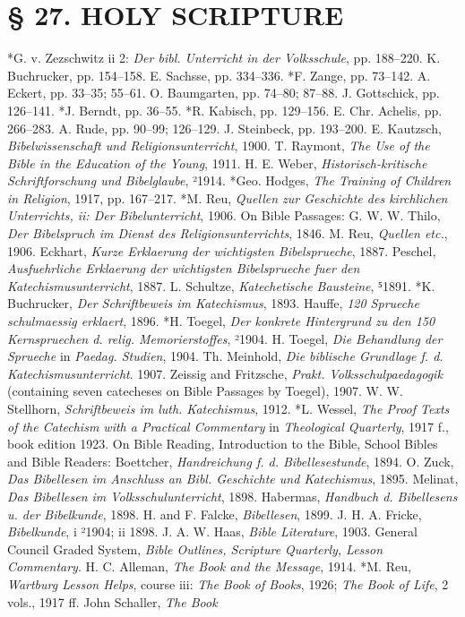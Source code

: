 \chapter[§ 27. Holy Scripture]{§ 27. HOLY SCRIPTURE}

*G. v. Zezschwitz ii 2: \emph{Der bibl. Unterricht in der Volksschule}, pp. 188–220. K. Buchrucker, pp. 154–158. E. Sachsse, pp. 334–336. *F. Zange, pp. 73–142. A. Eckert, pp. 33–35; 55–61. O. Baumgarten, pp. 74–80; 87–88. J. Gottschick, pp. 126–141. *J. Berndt, pp. 36–55. *R. Kabisch, pp. 129–156. E. Chr. Achelis, pp. 266–283. A. Rude, pp. 90–99; 126–129. J. Steinbeck, pp. 193–200. E. Kautzsch, \emph{Bibelwissenschaft und Religionsunterricht}, 1900. T. Raymont, \emph{The Use of the Bible in the Education of the Young}, 1911. H. E. Weber, \emph{Historisch-kritische Schriftforschung und Bibelglaube}, ²1914. *Geo. Hodges, \emph{The Training of Children in Religion}, 1917, pp. 167–217. *M. Reu, \emph{Quellen zur Geschichte des kirchlichen Unterrichts, ii: Der Bibelunterricht}, 1906. On Bible Passages: G. W. W. Thilo, \emph{Der Bibelspruch im Dienst des Religionsunterrichts}, 1846. M. Reu, \emph{Quellen etc.}, 1906. Eckhart, \emph{Kurze Erklaerung der wichtigsten Bibelsprueche}, 1887. Peschel, \emph{Ausfuehrliche Erklaerung der wichtigsten Bibelsprueche fuer den Katechismusunterricht}, 1887. L. Schultze, \emph{Katechetische Bausteine}, ⁵1891. *K. Buchrucker, \emph{Der Schriftbeweis im Katechismus}, 1893. Hauffe, \emph{120 Sprueche schulmaessig erklaert}, 1896. *H. Toegel, \emph{Der konkrete Hintergrund zu den 150 Kernspruechen d. relig. Memorierstoffes}, ²1904. H. Toegel, \emph{Die Behandlung der Sprueche} in \emph{Paedag. Studien}, 1904. Th. Meinhold, \emph{Die biblische Grundlage f. d. Katechismusunterricht}. 1907. Zeissig and Fritzsche, \emph{Prakt. Volksschulpaedagogik} (containing seven catecheses on Bible Passages by Toegel), 1907. W. W. Stellhorn, \emph{Schriftbeweis im luth. Katechismus}, 1912. *L. Wessel, \emph{The Proof Texts of the Catechism with a Practical Commentary} in \emph{Theological Quarterly}, 1917 f., book edition 1923. On Bible Reading, Introduction to the Bible, School Bibles and Bible Readers: Boettcher, \emph{Handreichung f. d. Bibellesestunde}, 1894. O. Zuck, \emph{Das Bibellesen im Anschluss an Bibl. Geschichte und Katechismus}, 1895. Melinat, \emph{Das Bibellesen im Volksschulunterricht}, 1898. Habermas, \emph{Handbuch d. Bibellesens u. der Bibelkunde}, 1898. H. and F. Falcke, \emph{Bibellesen}, 1899. J. H. A. Fricke, \emph{Bibelkunde}, i ²1904; ii 1898. J. A. W. Haas, \emph{Bible Literature}, 1903. General Council Graded System, \emph{Bible Outlines, Scripture Quarterly, Lesson Commentary}. H. C. Alleman, \emph{The Book and the Message}, 1914. *M. Reu, \emph{Wartburg Lesson Helps}, course iii: \emph{The Book of Books}, 1926; \emph{The Book of Life}, 2 vols., 1917 ff. John Schaller, \emph{The Book}
